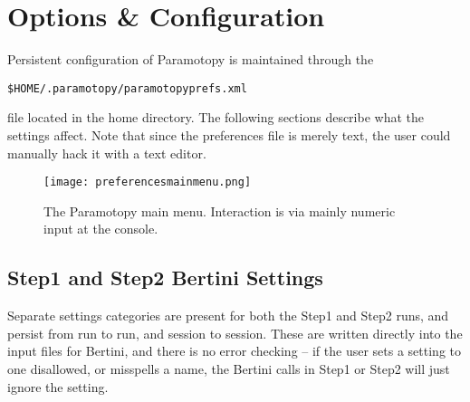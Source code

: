

















\clearpage
\section{Options \& Configuration}
\label{sec:options}

Persistent configuration of Paramotopy is maintained through the {\begin{center}\texttt{\$HOME/.paramotopy/paramotopyprefs.xml} \end{center}} \noindent file located in the home directory.  The following sections describe what the settings affect.  Note that since the preferences file is merely text, the user could manually hack it with a text editor.


\begin{figure}[h]
\begin{center}
\texttt{[image: preferencesmainmenu.png]}
\caption[Preferences Main Menu]{The Paramotopy main menu.  Interaction is via mainly numeric input at the console.}
\label{screen:prefsmainmenu}
\end{center}
\end{figure}


\subsection{Step1 and Step2 Bertini Settings}

Separate settings categories are present for both the Step1 and Step2 runs, and persist from run to run, and session to session.  These are written directly into the input files for Bertini, and there is no error checking -- if the user sets a setting to one disallowed, or misspells a name, the Bertini calls in Step1 or Step2 will just ignore the setting.

